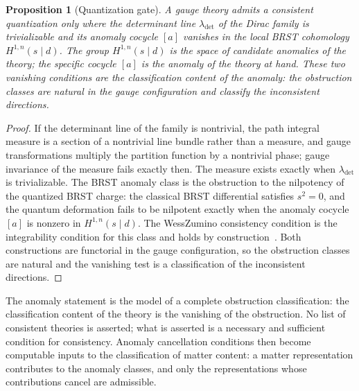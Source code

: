\documentclass[11pt,letterpaper]{article}
\newtheorem{proposition}[theorem]{Proposition}
\theoremstyle{definition}
\theoremstyle{remark}
\begin{document}
\begin{proposition}[Quantization gate]
\label{prop:anomaly}
A gauge theory admits a consistent quantization only where the determinant line $\lambda_{\mathrm{det}}$ of the Dirac family is trivializable and its anomaly cocycle $[a]$ vanishes in the local BRST cohomology $H^{1,n}(s\mid d)$. The group $H^{1,n}(s\mid d)$ is the space of candidate anomalies of the theory; the specific cocycle $[a]$ is the anomaly of the theory at hand. These two vanishing conditions are the classification content of the anomaly: the obstruction classes are natural in the gauge configuration and classify the inconsistent directions.
\end{proposition}

\begin{proof}
If the determinant line of the family is nontrivial, the path integral measure is a section of a nontrivial line bundle rather than a measure, and gauge transformations multiply the partition function by a nontrivial phase; gauge invariance of the measure fails exactly then. The measure exists exactly when $\lambda_{\mathrm{det}}$ is trivializable. The BRST anomaly class is the obstruction to the nilpotency of the quantized BRST charge: the classical BRST differential satisfies $s^2 = 0$, and the quantum deformation fails to be nilpotent exactly when the anomaly cocycle $[a]$ is nonzero in $H^{1,n}(s\mid d)$. The Wess\textendash{}Zumino consistency condition is the integrability condition for this class and holds by construction~\cite{bbh}. Both constructions are functorial in the gauge configuration, so the obstruction classes are natural and the vanishing test is a classification of the inconsistent directions.
\end{proof}

The anomaly statement is the model of a complete obstruction classification: the classification content of the theory is the vanishing of the obstruction. No list of consistent theories is asserted; what is asserted is a necessary and sufficient condition for consistency. Anomaly cancellation conditions then become computable inputs to the classification of matter content: a matter representation contributes to the anomaly classes, and only the representations whose contributions cancel are admissible.
\end{document}
